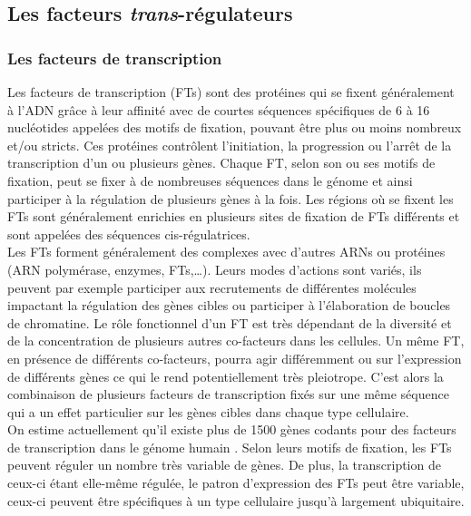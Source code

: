 \subsection{Les facteurs \textit{trans}-régulateurs}
\label{subsec:elem-trans}

\subsubsection{Les facteurs de transcription}
\label{subsubsec:facteur-trans}

Les facteurs de transcription (\acrshort{FT}s) sont des protéines qui se fixent généralement à l’ADN grâce à leur affinité avec de courtes séquences spécifiques de 6 à 16 nucléotides appelées des motifs de fixation, pouvant être plus ou moins nombreux et/ou stricts. Ces protéines contrôlent l’initiation, la progression ou l’arrêt de la transcription d’un ou plusieurs gènes. Chaque \acrshort{FT}, selon son ou ses motifs de fixation, peut se fixer à de nombreuses séquences dans le génome et ainsi participer à la régulation de plusieurs gènes à la fois. Les régions où se fixent les \acrshort{FT}s sont généralement enrichies en plusieurs sites de fixation de \acrshort{FT}s différents et sont appelées des séquences \gls{cis}-régulatrices.\\

Les \acrshort{FT}s forment généralement des complexes avec d’autres \acrshort{ARN}s ou protéines (ARN polymérase, enzymes, \acrshort{FT}s,…). Leurs modes d’actions sont variés, ils peuvent par exemple participer aux recrutements de différentes molécules impactant la régulation des gènes cibles ou participer à l’élaboration de boucles de chromatine. Le rôle fonctionnel d’un \acrshort{FT} est très dépendant de la diversité et de la concentration de plusieurs autres co-facteurs dans les cellules. Un même \acrshort{FT}, en présence de différents co-facteurs, pourra agir différemment ou sur l’expression de différents gènes ce qui le rend potentiellement très \gls{pleiotrope}. C’est alors la combinaison de plusieurs facteurs de transcription fixés sur une même séquence qui a un effet particulier sur les gènes cibles dans chaque type cellulaire. \\

On estime actuellement qu’il existe plus de 1500 gènes codants pour des facteurs de transcription dans le génome humain \citep{wingender_tfclass_2018}. Selon leurs motifs de fixation, les \acrshort{FT}s peuvent réguler un nombre très variable de gènes. De plus, la transcription de ceux-ci étant elle-même régulée, le patron d’expression des \acrshort{FT}s peut être variable, ceux-ci peuvent être spécifiques à un type cellulaire jusqu'à largement ubiquitaire.

